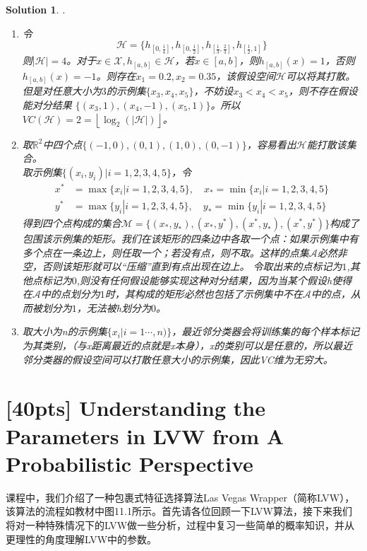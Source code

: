 \documentclass[a4paper,UTF8]{article}
\newtheorem*{solution}{Solution}
\numberwithin{equation}{section}
\begin{document}
\begin{solution}.
\begin{enumerate}[$(1)$]
	\item 令$$\mathcal{H}=\{h_{[0,\frac{1}{4}]},h_{[0,\frac{1}{2}]},h_{[\frac{1}{3},\frac{2}{3}]},h_{[\frac{1}{2},1]}\}$$
	则$|\mathcal{H}|=4$。对于$x\in\mathcal{X},h_{[a,b]}\in\mathcal{H}$，若$x\in [a,b]$，则$h_{[a,b]}(x)=1$，否则$h_{[a,b]}(x)=-1$。则存在$x_1=0.2,x_2=0.35$，该假设空间$\mathcal{H}$可以将其打散。但是对任意大小为$3$的示例集$\{x_3,x_4,x_5\}$，不妨设$x_3<x_4<x_5$，则不存在假设能对分结果
	$\{(x_3,1),(x_4,-1),(x_5,1)\}$。所以$VC(\mathcal{H})=2=\left \lfloor \log_2(\left| \mathcal{H} \right| ) \right \rfloor$。
	\item 取$\mathbb{R}^2$中四个点$\{(-1,0),(0,1),(1,0),(0,-1)\}$，容易看出$\mathcal{H}$能打散该集合。\\
	      取示例集$\{(x_i,y_i)|i=1,2,3,4,5\}$，令
	      \begin{align*}
	      	x^*&=\max\{x_i|i=1,2,3,4,5\},\quad
	      	x_*=\min\{x_i|i=1,2,3,4,5\}\\
	      	y^*&=\max\{y_i|i=1,2,3,4,5\},\quad
	      	y_*=\min\{y_i|i=1,2,3,4,5\}
	      \end{align*}
          得到四个点构成的集合$\mathcal{M}=\{(x_*,y_*),(x_*,y^*),(x^*,y_*),(x^*,y^*)\}$构成了包围该示例集的矩形。我们在该矩形的四条边中各取一个点：如果示例集中有多个点在一条边上，则任取一个；若没有点，则不取。这样的点集$\mathcal{A}$必然非空，否则该矩形就可以“压缩”直到有点出现在边上。
	      令取出来的点标记为$1$,其他点标记为$0$,则没有任何假设能够实现这种对分结果，因为当某个假设h使得在$\mathcal{A}$中的点划分为$1$时，其构成的矩形必然也包括了示例集中不在$\mathcal{A}$中的点，从而被划分为$1$，无法被h划分为$0$。
	 \item 取大小为n的示例集$\{x_i|i=1\cdots,n)\}$，最近邻分类器会将训练集的每个样本标记为其类别，（与x距离最近的点就是x本身），x的类别可以是任意的，所以最近邻分类器的假设空间可以打散任意大小的示例集，因此VC维为无穷大。
\end{enumerate}
\end{solution}

\section{\textbf{[40pts]} Understanding the Parameters in LVW from A Probabilistic Perspective}
课程中，我们介绍了一种包裹式特征选择算法Las Vegas Wrapper（简称LVW），该算法的流程如教材中图11.1所示。首先请各位回顾一下LVW算法，接下来我们将对一种特殊情况下的LVW做一些分析，过程中复习一些简单的概率知识，并从更理性的角度理解LVW中的参数。
\end{document}
